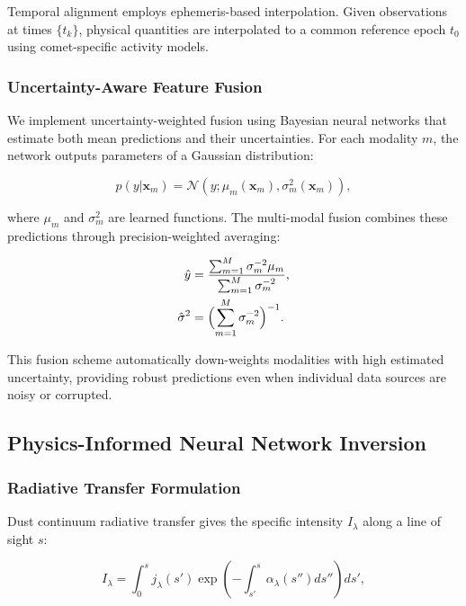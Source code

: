 \documentclass[preprint2]{aastex631}
\begin{document}
Temporal alignment employs ephemeris-based interpolation. Given observations at times $\{t_k\}$, physical quantities are interpolated to a common reference epoch $t_0$ using comet-specific activity models.

\subsubsection{Uncertainty-Aware Feature Fusion}

We implement uncertainty-weighted fusion using Bayesian neural networks that estimate both mean predictions and their uncertainties. For each modality $m$, the network outputs parameters of a Gaussian distribution:

\begin{equation}\label{eq:prob_output}
p(y | \mathbf{x}_m) = \mathcal{N}(y; \mu_m(\mathbf{x}_m), \sigma_m^2(\mathbf{x}_m)),
\end{equation}

where $\mu_m$ and $\sigma_m^2$ are learned functions. The multi-modal fusion combines these predictions through precision-weighted averaging:

\begin{equation}\label{eq:uncertainty_fusion}
\begin{split}
\hat{y} &= \frac{\sum_{m=1}^{M} \sigma_m^{-2} \mu_m}{\sum_{m=1}^{M} \sigma_m^{-2}}, \\
\hat{\sigma}^2 &= \Bigl(\sum_{m=1}^{M} \sigma_m^{-2}\Bigr)^{-1}.
\end{split}
\end{equation}

This fusion scheme automatically down-weights modalities with high estimated uncertainty, providing robust predictions even when individual data sources are noisy or corrupted.

\subsection{Physics-Informed Neural Network Inversion}

\subsubsection{Radiative Transfer Formulation}

Dust continuum radiative transfer gives the specific intensity $I_\lambda$ along a line of sight $s$:

\begin{equation}\label{eq:rt_dust}
I_\lambda = \int_{0}^{s} j_\lambda(s') \exp\left(-\int_{s'}^{s} \alpha_\lambda(s'') ds''\right) ds',
\end{equation}
\end{document}
